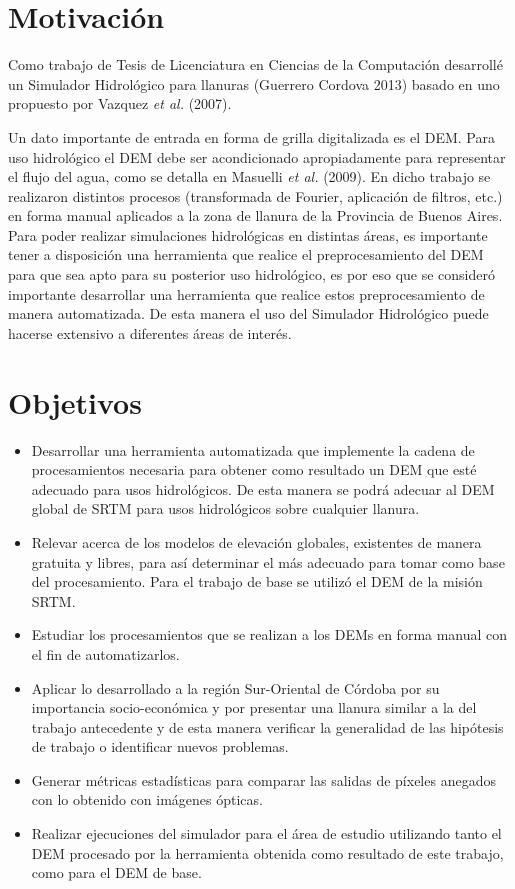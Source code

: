 \documentclass[10pt,a4paper, twoside]{report}
\begin{document}
\section{Motivación}

Como trabajo de Tesis de Licenciatura en Ciencias de la Computación desarrollé un Simulador Hidrológico para llanuras (Guerrero Cordova 2013) basado en uno propuesto por Vazquez \textit{et al.} (2007).

Un dato importante de entrada en forma de grilla digitalizada es el DEM. Para uso hidrológico el DEM debe ser acondicionado apropiadamente para representar el flujo del agua, como se detalla en Masuelli \textit{et al.} (2009). En dicho trabajo se realizaron distintos procesos (transformada de Fourier, aplicación de filtros, etc.) en forma manual aplicados a la zona de llanura de la Provincia de Buenos Aires. Para poder realizar simulaciones hidrológicas en distintas áreas, es importante tener a disposición una herramienta que realice el preprocesamiento del DEM para que sea apto para su posterior uso hidrológico, es por eso que se consideró importante desarrollar una herramienta que realice estos preprocesamiento de manera automatizada. De esta manera el uso del Simulador Hidrológico puede hacerse extensivo a diferentes áreas de interés.

\section{Objetivos}


\begin{itemize}
	\item Desarrollar una herramienta automatizada que implemente la cadena de procesamientos necesaria para obtener como resultado un DEM que esté adecuado para usos hidrológicos. De esta manera se podrá adecuar al DEM global de SRTM para usos hidrológicos sobre cualquier llanura.
	\item Relevar acerca de los modelos de elevación globales, existentes de manera gratuita y libres, para así determinar el más adecuado para tomar como base del procesamiento. Para el trabajo de base se utilizó el DEM de la misión SRTM.
	\item Estudiar los procesamientos que se realizan a los DEMs en forma manual con el fin de automatizarlos.
	\item Aplicar lo desarrollado a la región Sur-Oriental de Córdoba por su importancia socio-económica y por presentar una llanura similar a la del trabajo antecedente y de esta manera verificar la generalidad de las hipótesis de trabajo o identificar nuevos problemas.
	\item Generar métricas estadísticas para comparar las salidas de píxeles anegados con lo obtenido con imágenes ópticas.
	\item Realizar ejecuciones del simulador para el área de estudio utilizando tanto el DEM procesado por la herramienta obtenida como resultado de este trabajo, como para el DEM de base.	
\end{itemize}
\end{document}
